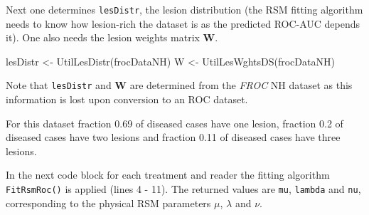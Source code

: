 \documentclass[
]{book}
\newenvironment{Shaded}{\begin{snugshade}}{\end{snugshade}}
\newcommand{\AttributeTok}[1]{\textcolor[rgb]{0.77,0.63,0.00}{#1}}
\newcommand{\CommentTok}[1]{\textcolor[rgb]{0.56,0.35,0.01}{\textit{#1}}}
\newcommand{\ControlFlowTok}[1]{\textcolor[rgb]{0.13,0.29,0.53}{\textbf{#1}}}
\newcommand{\DecValTok}[1]{\textcolor[rgb]{0.00,0.00,0.81}{#1}}
\newcommand{\FunctionTok}[1]{\textcolor[rgb]{0.00,0.00,0.00}{#1}}
\newcommand{\NormalTok}[1]{#1}
\newcommand{\OtherTok}[1]{\textcolor[rgb]{0.56,0.35,0.01}{#1}}
\newcommand{\SpecialCharTok}[1]{\textcolor[rgb]{0.00,0.00,0.00}{#1}}
\begin{document}
Next one determines \texttt{lesDistr}, the lesion distribution (the RSM fitting algorithm needs to know how lesion-rich the dataset is as the predicted ROC-AUC depends it). One also needs the lesion weights matrix \(\textbf{W}\).

\begin{Shaded}
\begin{Highlighting}[]
\NormalTok{lesDistr }\OtherTok{\textless{}{-}} \FunctionTok{UtilLesDistr}\NormalTok{(frocDataNH)}
\NormalTok{W }\OtherTok{\textless{}{-}} \FunctionTok{UtilLesWghtsDS}\NormalTok{(frocDataNH)}
\end{Highlighting}
\end{Shaded}

Note that \texttt{lesDistr} and \(\textbf{W}\) are determined from the \emph{FROC} NH dataset as this information is lost upon conversion to an ROC dataset.

For this dataset fraction 0.69 of diseased cases have one lesion, fraction 0.2 of diseased cases have two lesions and fraction 0.11 of diseased cases have three lesions.

In the next code block for each treatment and reader the fitting algorithm \texttt{FitRsmRoc()} is applied (lines 4 - 11). The returned values are \texttt{mu}, \texttt{lambda} and \texttt{nu}, corresponding to the physical RSM parameters \({\mu}\), \({\lambda}\) and \({\nu}\).

\begin{Shaded}
\end{Shaded}
\end{document}
